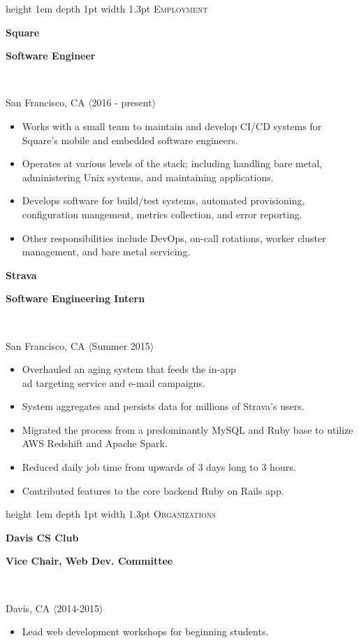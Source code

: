 \documentclass[letterpaper,10pt]{article}
\newcommand{\sectiontitle}[1]{
	{\color{magenta} \vline height 1em depth 1pt width 1.3pt}%
	{\large \colorbox{offwhite}{\color{black} \textsc{#1}}}
	\vspace*{0.5em}
}
\newcommand{\sectionseparator}{
	\vspace*{0.3em}
}
\newcommand{\experiencepanel}[4]{
	\textbf{{#1}}
	\begin{footnotesize}
		\textbf{{#2}}
	\end{footnotesize}
	\\
	\begin{scriptsize}
		{#3} $\langle${#4}$\rangle$
	\end{scriptsize}
}
\newenvironment{statementlist}{
		\begin{small}
		\begin{itemize}
}{
		\end{itemize}
		\end{small}
		\vspace*{0.5em}
}
\begin{document}
	\begin{minipage}[t]{0.50\textwidth}

		\sectiontitle{Employment}


		\experiencepanel{Square}{Software Engineer}{San Francisco, CA}{2016 - present}
		\begin{statementlist}
			\item Works with a small team to maintain and develop CI/CD systems for Square's mobile and embedded software engineers.
			\item Operates at various levels of the stack; including handling bare metal, administering Unix systems, and maintaining applications.
			\item Develops software for build/test systems, automated provisioning, configuration mangement, metrics collection, and error reporting.
			\item Other responsibilities include DevOps, on-call rotations, worker cluster management, and bare metal servicing.
		\end{statementlist}

		\experiencepanel{Strava}{Software Engineering Intern}{San Francisco, CA}{Summer 2015}
		\begin{statementlist}
			\item Overhauled an aging system that feeds the in-app \\ad targeting service and e-mail campaigns.
			\item System aggregates and persists data for millions of Strava's users.
			\item Migrated the process from a predominantly MySQL and Ruby base to utilize AWS Redshift and Apache Spark.
			\item Reduced daily job time from upwards of 3 days long to 3 hours.
			\item Contributed features to the core backend Ruby on Rails app.
		\end{statementlist}

		\sectionseparator

		\sectiontitle{Organizations}

		\experiencepanel{Davis CS Club}{Vice Chair, Web Dev. Committee}{Davis, CA}{2014-2015}
		\begin{statementlist}
			\item Lead web development workshops for beginning students.
		\end{statementlist}


\end{minipage}
\end{document}
